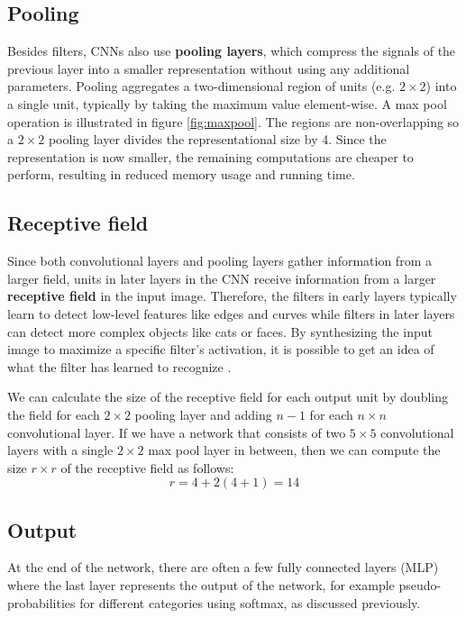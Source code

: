 \subsection{Pooling}


Besides filters, CNNs also use \textbf{pooling layers}, which compress the signals of the previous layer into a smaller representation without using any additional parameters.
Pooling aggregates a two-dimensional region of units (e.g. $2 \times 2$) into a single unit, typically by taking the maximum value element-wise. A max pool operation is illustrated in figure \ref{fig:maxpool}.
The regions are non-overlapping so a $2 \times 2$ pooling layer divides the representational size by 4.
Since the representation is now smaller, the remaining computations are cheaper to perform, resulting in reduced memory usage and running time.

\subsection{Receptive field}
Since both convolutional layers and pooling layers gather information from a larger field, units in later layers in the CNN receive information from a larger \textbf{receptive field} in the input image.
Therefore, the filters in early layers typically learn to detect low-level features like edges and curves while filters in later layers can detect more complex objects like cats or faces.
By synthesizing the input image to maximize a specific filter's activation, it is possible to get an idea of what the filter has learned to recognize \cite{VisualizeCnn}.

We can calculate the size of the receptive field for each output unit by doubling the field for each $2 \times 2$ pooling layer and adding $n-1$ for each $n \times n$ convolutional layer.
If we have a network that consists of two $5 \times 5$ convolutional layers with a single $2 \times 2$ max pool layer in between, then we can compute the size $r \times r$ of the receptive field as follows:
\[
r = 4 + 2(4 + 1) = 14
\]

\subsection{Output}
At the end of the network, there are often a few fully connected layers (MLP) where the last layer represents the output of the network, for example pseudo-probabilities for different categories using softmax, as discussed previously.

